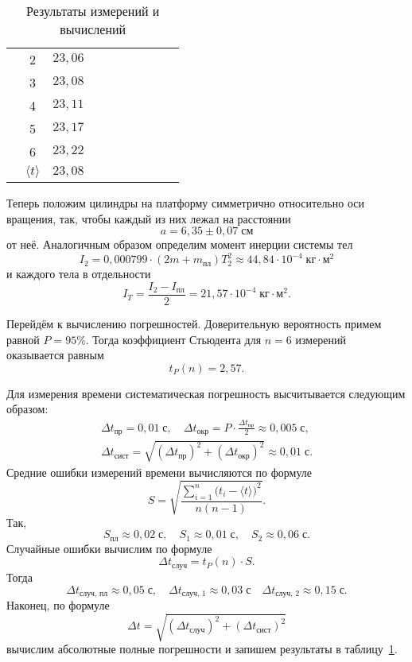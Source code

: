 \begin{table}[h]
\begin{center}
\begin{tabular}{|c|c|c|c|c|c|c|c|c|c|}
		\cline{2-3}
		& 2 & $23{,}06$ & & & & & & & \\
		\cline{2-3}
		& 3 & $23{,}08$ & & & & & & & \\
		\cline{2-3}
		& 4 & $23{,}11$ & & & & & & & \\
		\cline{2-3}
		& 5 & $23{,}17$ & & & & & & & \\
		\cline{2-3}
		& 6 & $23{,}22$ & & & & & & & \\
		\cline{2-3}
		& $\langle t\rangle$ & $23{,}08$ & & & & & & & \\
		\hline
	\end{tabular}
	\caption{Результаты измерений и вычислений}\label{TbOne}
	\end{center}
\end{table}

Теперь положим цилиндры на платформу симметрично относительно оси вращения, так, чтобы каждый из них лежал на расстоянии
\[
a=6{,}35\pm0{,}07\;\text{см}
\]
от неё. Аналогичным образом определим момент инерции системы тел
\[
I_2=0{,}000799\cdot(2m+m_\text{пл})T_{2}^2\approx44{,}84\cdot10^{-4}\;\text{кг$\cdot$м$^2$}
\]
и каждого тела в отдельности
\[
I_T=\frac{I_{2}-I_\text{пл}}{2}=21{,}57\cdot10^{-4}\;\text{кг$\cdot$м$^2$}.
\]

Перейдём к вычислению погрешностей. Доверительную вероятность примем равной $P=95\%$. Тогда коэффициент Стьюдента для $n=6$ измерений оказывается равным
\[
t_P(n)=2{,}57.
\]

Для измерения времени систематическая погрешность высчитывается следующим образом:
\begin{gather*}
\Delta t_\text{пр}=0{,}01\;\text{с},\quad\Delta t_\text{окр}=P\cdot\frac{\Delta t_\text{пр}}{2}\approx0{,}005\;\text{с}, \\
\Delta t_\text{сист}=\sqrt{(\Delta t_\text{пр})^2+(\Delta t_\text{окр})^2}\approx0{,}01\;\text{с}.
\end{gather*}
Средние ошибки измерений времени вычисляются по формуле
\[
S=\sqrt{\frac{\sum\limits_{i=1}^n\bigl(t_i-\langle t\rangle\bigr)^2}{n(n-1)}}.
\]
Так,
\[
S_\text{пл}\approx0{,}02\;\text{с},\quad S_1\approx0{,}01\;\text{с},\quad S_2\approx0{,}06\;\text{с}.
\]
Случайные ошибки вычислим по формуле
\[
\Delta t_\text{случ}=t_P(n)\cdot S.
\]
Тогда
\[
\Delta t_\text{случ, пл}\approx0{,}05\;\text{с},\quad\Delta t_\text{случ, 1}\approx0{,}03\;\text{с}\quad\Delta t_\text{случ, 2}\approx0{,}15\;\text{с}.
\]
Наконец, по формуле
\[
\Delta t=\sqrt{(\Delta t_\text{случ})^2+(\Delta t_\text{сист})^2}
\]
вычислим абсолютные полные погрешности и запишем результаты в таблицу~\ref{TbOne}.

